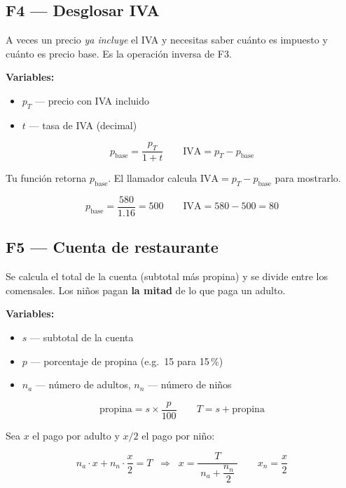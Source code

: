 \documentclass[12pt, oneside]{article}
\begin{document}
\subsection{F4 — Desglosar IVA}

A veces un precio \textit{ya incluye} el IVA y necesitas saber cuánto es
impuesto y cuánto es precio base.  Es la operación inversa de F3.

\textbf{Variables:}
\begin{itemize}
  \item $p_T$ — precio con IVA incluido
  \item $t$ — tasa de IVA (decimal)
\end{itemize}

\[
  p_{\text{base}} = \frac{p_T}{1 + t}
  \qquad
  \text{IVA} = p_T - p_{\text{base}}
\]

Tu función retorna $p_{\text{base}}$.  El llamador calcula
$\text{IVA} = p_T - p_{\text{base}}$ para mostrarlo.

\begin{ejemplo}
  \[
    p_{\text{base}} = \frac{580}{1.16} = 500
    \qquad
    \text{IVA} = 580 - 500 = 80
  \]
\end{ejemplo}

\subsection{F5 — Cuenta de restaurante}

Se calcula el total de la cuenta (subtotal más propina) y se divide entre
los comensales.  Los niños pagan \textbf{la mitad} de lo que paga un adulto.

\textbf{Variables:}
\begin{itemize}
  \item $s$ — subtotal de la cuenta
  \item $p$ — porcentaje de propina (e.g.\ 15 para 15\,\%)
  \item $n_a$ — número de adultos, \quad $n_n$ — número de niños
\end{itemize}

\[
  \text{propina} = s \times \frac{p}{100}
  \qquad
  T = s + \text{propina}
\]

Sea $x$ el pago por adulto y $x/2$ el pago por niño:

\[
  n_a \cdot x + n_n \cdot \frac{x}{2} = T
  \;\;\Longrightarrow\;\;
  x = \frac{T}{\;n_a + \dfrac{n_n}{2}\;}
  \qquad
  x_n = \frac{x}{2}
\]
\end{document}
